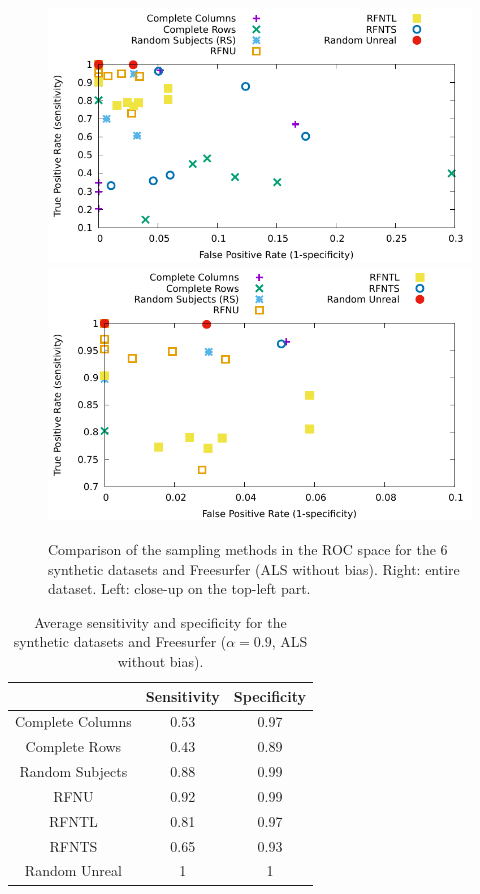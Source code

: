 \documentclass[10pt, conference, compsocconf]{IEEEtran}
\begin{document}
\begin{figure}
\includegraphics[width=\columnwidth]{data/results/roc/roc.pdf}
\includegraphics[width=\columnwidth]{data/results/roc/roc-closeup.pdf}
\caption{Comparison of the sampling methods in the ROC space for the 6 synthetic datasets and Freesurfer (ALS without bias). Right: entire dataset. Left: close-up on the top-left part.}
\label{fig:roc}
\end{figure}

\begin{table}
\centering
\begin{tabular}{ccc}
& Sensitivity & Specificity \\
\hline
Complete Columns & 0.53 & 0.97\\
Complete Rows & 0.43 & 0.89\\
Random Subjects & 0.88 & 0.99\\
RFNU & 0.92 & 0.99 \\
RFNTL & 0.81 & 0.97\\
RFNTS & 0.65 & 0.93 \\
Random Unreal & 1 & 1
\end{tabular}
\caption{Average sensitivity and specificity for the synthetic datasets and Freesurfer ($\alpha=0.9$, ALS without bias).}
\label{table:roc}
\end{table}
\end{document}
